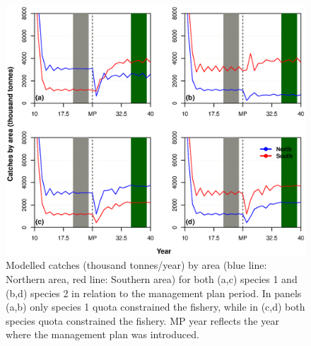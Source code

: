 \documentclass[12pt,oneline,a4paper,numbib]{ouparticle}
\numberwithin{equation}{subsection} %
\begin{document}
\begin{figure}[!ht]
\centering
\includegraphics[width=\textwidth]{Figures/Catchesbyarea.eps} 
\caption{Modelled catches (thousand tonnes/year) by area (blue line: Northern area, red line: Southern area) for both (a,c) species 1 and (b,d) species 2 in relation to the management plan period. In panels (a,b) only species 1 quota constrained the fishery, while in (c,d) both species quota constrained the fishery. MP year reflects the year where the management plan was introduced.}
\label{f:effortecon}
\end{figure} 
\end{document}
